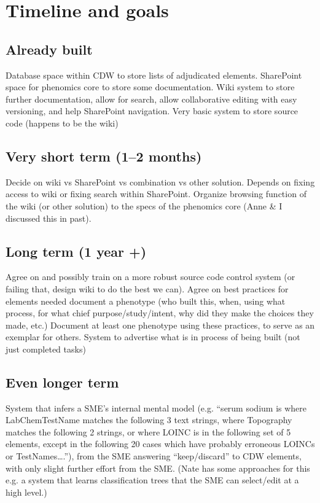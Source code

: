 \documentclass{tufte-handout}
\begin{document}
\section{Timeline and goals}

\subsection{Already built}

Database space within CDW to store lists of adjudicated elements.
SharePoint space for phenomics core to store some documentation. Wiki
system to store further documentation, allow for search, allow
collaborative editing with easy versioning, and help SharePoint
navigation. Very basic system to store source code (happens to be the
wiki)

\subsection{Very short term (1--2 months)}

Decide on wiki vs SharePoint vs combination vs other solution. Depends
on fixing access to wiki or fixing search within SharePoint. Organize
browsing function of the wiki (or other solution) to the specs of the
phenomics core (Anne \& I discussed this in past).

\subsection{Long term (1 year +)}

Agree on and possibly train on a more robust source code control
system (or failing that, design wiki to do the best we can). Agree on
best practices for elements needed document a phenotype (who built
this, when, using what process, for what chief purpose/study/intent,
why did they make the choices they made, etc.) Document at least one
phenotype using these practices, to serve as an exemplar for others.
System to advertise what is in process of being built (not just
completed tasks)

\subsection{Even longer term}

System that infers a SME's internal mental model (e.g. ``serum sodium
is where LabChemTestName matches the following 3 text strings, where
Topography matches the following 2 strings, or where LOINC is in the
following set of 5 elements, except in the following 20 cases which
have probably erroneous LOINCs or TestNames\ldots{}.''), from the SME
answering ``keep/discard'' to CDW elements, with only slight further
effort from the SME. (Nate has some approaches for this e.g. a system
that learns classification trees that the SME can select/edit at a
high level.)
\end{document}
